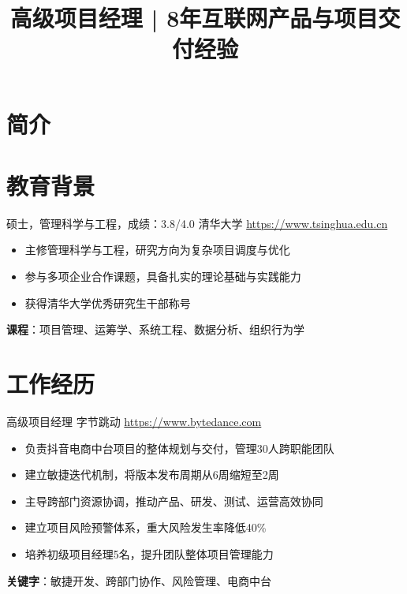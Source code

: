 \documentclass[a4paper, serif, 10pt]{moderncv}
\title{高级项目经理 | 8年互联网产品与项目交付经验}
\begin{document}
\maketitle

\section{简介}

\section{教育背景}

        {硕士，管理科学与工程，成绩：3.8/4.0}
        {清华大学}
        {\url{https://www.tsinghua.edu.cn}}
        {}
        {\begin{itemize}
\item 主修管理科学与工程，研究方向为复杂项目调度与优化
\item 参与多项企业合作课题，具备扎实的理论基础与实践能力
\item 获得清华大学优秀研究生干部称号
\end{itemize}
\textbf{课程}：项目管理、运筹学、系统工程、数据分析、组织行为学}
\section{工作经历}

        {高级项目经理}
        {字节跳动}
        {\url{https://www.bytedance.com}}
        {}
        {\begin{itemize}
\item 负责抖音电商中台项目的整体规划与交付，管理30人跨职能团队
\item 建立敏捷迭代机制，将版本发布周期从6周缩短至2周
\item 主导跨部门资源协调，推动产品、研发、测试、运营高效协同
\item 建立项目风险预警体系，重大风险发生率降低40\%
\item 培养初级项目经理5名，提升团队整体项目管理能力
\end{itemize}
\textbf{关键字}：敏捷开发、跨部门协作、风险管理、电商中台}
\end{document}
